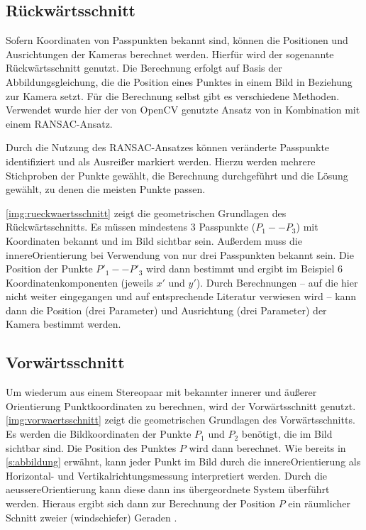 \documentclass[./00PhotoBox.tex]{subfiles}
\begin{document}
\subsection{Rückwärtsschnitt}
Sofern Koordinaten von Passpunkten bekannt sind, können die Positionen und Ausrichtungen der Kameras berechnet werden. Hierfür wird der sogenannte Rückwärtsschnitt genutzt. Die Berechnung erfolgt auf Basis der Abbildungsgleichung, die die Position eines Punktes in einem Bild in Beziehung zur Kamera setzt. Für die Berechnung selbst gibt es verschiedene Methoden. Verwendet wurde hier der von OpenCV genutzte Ansatz von \cite{Lepetit2008} in Kombination mit einem RANSAC-Ansatz.

Durch die Nutzung des RANSAC-Ansatzes können veränderte Passpunkte identifiziert und als Ausreißer markiert werden. Hierzu werden mehrere Stichproben der Punkte gewählt, die Berechnung durchgeführt und die Lösung gewählt, zu denen die meisten Punkte passen. \citep[S. 134]{luhmann}

\autoref{img:rueckwaertsschnitt} zeigt die geometrischen Grundlagen des Rückwärtsschnitts. Es müssen mindestens 3 Passpunkte ($P_1 - - P_3$) mit Koordinaten bekannt und im Bild sichtbar sein. Außerdem muss die \gls{innereOrientierung} bei Verwendung von nur drei Passpunkten bekannt sein. Die Position der Punkte $P'_1 - - P'_3$ wird dann bestimmt und ergibt im Beispiel 6 Koordinatenkomponenten (jeweils $x'$ und $y'$). Durch Berechnungen -- auf die hier nicht weiter eingegangen und auf entsprechende Literatur verwiesen wird -- kann dann die Position (drei Parameter) und Ausrichtung (drei Parameter) der Kamera bestimmt werden. \citep[S. 284]{luhmann}

\subsection{Vorwärtsschnitt}
Um wiederum aus einem Stereopaar mit bekannter innerer und äußerer Orientierung Punktkoordinaten zu berechnen, wird der Vorwärtsschnitt genutzt. \autoref{img:vorwaertsschnitt} zeigt die geometrischen Grundlagen des Vorwärtsschnitts. Es werden die Bildkoordinaten der Punkte $P_1$ und $P_2$ benötigt, die im Bild sichtbar sind. Die Position des Punktes $P$ wird dann berechnet. Wie bereits in \autoref{s:abbildung} erwähnt, kann jeder Punkt im Bild durch die \gls{innereOrientierung} als Horizontal- und Vertikalrichtungsmessung interpretiert werden. Durch die \gls{aeussereOrientierung} kann diese dann ins übergeordnete System überführt werden. Hieraus ergibt sich dann zur Berechnung der Position $P$ ein räumlicher Schnitt zweier (windschiefer) Geraden \citep[S. 95]{luhmann}.
\end{document}
